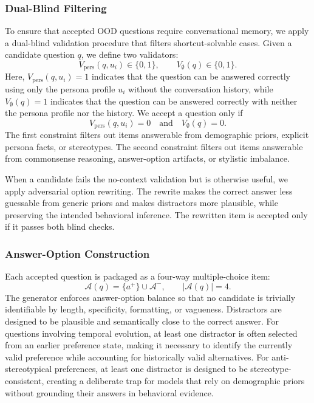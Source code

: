 \documentclass{article}
\begin{document}
\subsubsection{Dual-Blind Filtering}
\label{app:persona_dual_blind_filtering}
To ensure that accepted OOD questions require conversational memory, we apply a dual-blind validation procedure that filters shortcut-solvable cases. Given a candidate question $q$, we define two validators:
\[
V_{\mathrm{pers}}(q,u_i) \in \{0,1\},
\qquad
V_{\emptyset}(q) \in \{0,1\}.
\]
Here, $V_{\mathrm{pers}}(q,u_i)=1$ indicates that the question can be answered correctly using only the persona profile $u_i$ without the conversation history, while $V_{\emptyset}(q)=1$ indicates that the question can be answered correctly with neither the persona profile nor the history. We accept a question only if
\[
V_{\mathrm{pers}}(q,u_i)=0
\quad \text{and} \quad
V_{\emptyset}(q)=0.
\]
The first constraint filters out items answerable from demographic priors, explicit persona facts, or stereotypes. The second constraint filters out items answerable from commonsense reasoning, answer-option artifacts, or stylistic imbalance.

When a candidate fails the no-context validation but is otherwise useful, we apply adversarial option rewriting. The rewrite makes the correct answer less guessable from generic priors and makes distractors more plausible, while preserving the intended behavioral inference. The rewritten item is accepted only if it passes both blind checks.

\subsubsection{Answer-Option Construction}
\label{app:persona_answer_options}
Each accepted question is packaged as a four-way multiple-choice item:
\[
\mathcal{A}(q)=\{a^{+}\}\cup\mathcal{A}^{-},
\qquad
|\mathcal{A}(q)|=4.
\]
The generator enforces answer-option balance so that no candidate is trivially identifiable by length, specificity, formatting, or vagueness. Distractors are designed to be plausible and semantically close to the correct answer. For questions involving temporal evolution, at least one distractor is often selected from an earlier preference state, making it necessary to identify the currently valid preference while accounting for historically valid alternatives. For anti-stereotypical preferences, at least one distractor is designed to be stereotype-consistent, creating a deliberate trap for models that rely on demographic priors without grounding their answers in behavioral evidence.
\end{document}
